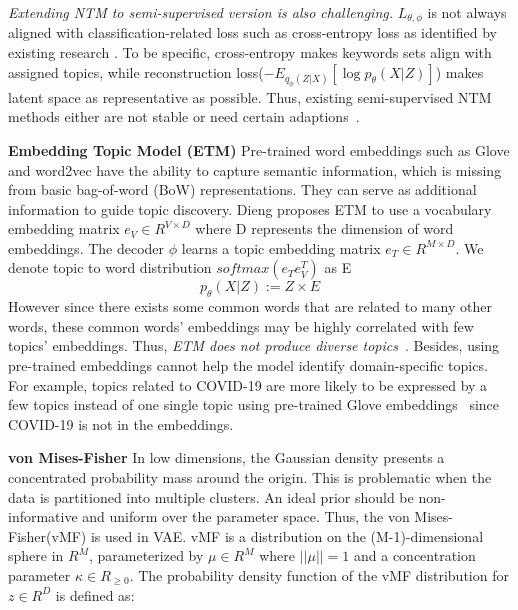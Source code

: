 \documentclass[11pt]{article}
\begin{document}
\textit{Extending NTM to semi-supervised version is also challenging.} $L_{\theta, \phi}$ is not always aligned with classification-related loss such as cross-entropy loss as identified by existing research \cite{https://doi.org/10.48550/arxiv.2204.03208}. To be specific, cross-entropy makes keywords sets align with assigned topics, while reconstruction loss($-E_{q_{\phi}(Z|X)}[\log p_{\theta} (X|Z)]$) makes latent space as representative as possible. Thus, existing semi-supervised NTM methods either are not stable \cite{wang2021neural,Harandizadeh_2022} or need certain adaptions~\cite{gemp2019weakly}. 

\textbf{Embedding Topic Model (ETM)} Pre-trained word embeddings such as Glove \cite{pennington-etal-2014-glove} and word2vec \cite{mikolov2013efficient} have the ability to capture semantic information, which is missing from basic bag-of-word (BoW) representations. 
They can serve as additional information to guide topic discovery. Dieng \cite{dieng2020topic} proposes ETM to use a vocabulary embedding matrix $e_{V} \in R^{V \times D}$ where D represents the dimension of word embeddings. The decoder $\phi$ learns a topic embedding matrix $e_{T} \in R^{M \times D}$. We denote topic to word distribution $ softmax(e_{T}  e_{V}^{T})$ as E  \begin{equation} p_{\theta}(X|Z) := Z \times E \label{eq11} \end{equation}  However since there exists some common words that are related to many other words, these common words' embeddings may be highly correlated with few topics' embeddings. Thus, \textit{ETM does not produce diverse topics}~\cite{zhao2020neural}. Besides, using pre-trained embeddings cannot help the model identify domain-specific topics. For example, topics related to COVID-19 are more likely to be expressed by a few topics instead of one single topic using pre-trained Glove embeddings~\cite{pennington2014glove} since COVID-19 is not in the embeddings. 


\textbf{von Mises-Fisher} In low dimensions, the Gaussian density presents a concentrated probability mass around the origin. This is problematic when the data is partitioned into multiple clusters. An ideal prior should be non-informative and uniform over the parameter space. Thus, the von Mises-Fisher(vMF) is used in VAE. vMF is a distribution on the (M-1)-dimensional sphere in $R^{M}$, parameterized by $\mu \in R^{M}$ where $||\mu|| = 1$ and a concentration parameter $\kappa \in R_{\geq 0}$. The probability density function of the vMF distribution for $z \in R^{D}$ is defined as:
\end{document}

